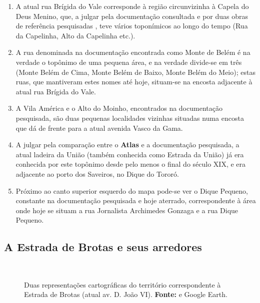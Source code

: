 \begin{citacao}
\begin{enumerate}
\item A atual rua Brígida do Vale corresponde à região circunvizinha à Capela do Deus Menino, que, a julgar pela documentação consultada e por duas obras de referência pesquisadas \cite{municipal_atlas_1955,souza_guia_1935}, teve vários toponímicos ao longo do tempo (Rua da Capelinha, Alto da Capelinha etc.).
\item A rua denominada na documentação encontrada como Monte de Belém é na verdade o topônimo de uma pequena área, e na verdade divide-se em três (Monte Belém de Cima, Monte Belém de Baixo, Monte Belém do Meio); estas ruas, que mantiveram estes nomes até hoje, situam-se na encosta adjacente à atual rua Brígida do Vale.
\item A Vila América e o Alto do Moinho, encontrados na documentação pesquisada, são duas pequenas localidades vizinhas situadas numa encosta que dá de frente para a atual avenida Vasco da Gama.
\item A julgar pela comparação entre o \textbf{Atlas} e a documentação pesquisada, a atual ladeira da União (também conhecida como Estrada da União) já era conhecida por este topônimo desde pelo menos o final do século XIX, e era adjacente ao porto dos Saveiros, no Dique do Tororó.
\item Próximo ao canto superior esquerdo do mapa pode-se ver o Dique Pequeno, constante na documentação pesquisada e hoje aterrado, correspondente à área onde hoje se situam a rua Jornalista Archimedes Gonzaga e a rua Dique Pequeno.
\end{enumerate}






\subsection{A Estrada de Brotas e seus arredores}

\begin{figure}[!htp]
\centering
{}
\  %
\caption{Duas representações cartográficas do território correspondente à Estrada de Brotas (atual av. D. João VI). \textbf{Fonte:}  e Google Earth.}
\end{figure}


\end{citacao}
